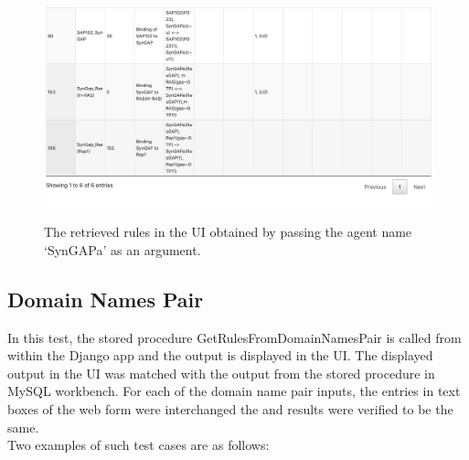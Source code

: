 \documentclass[msc,deptreport,ai]{infthesis}      %
\begin{document}
\begin{enumerate}
\begin{figure}[H]
		\includegraphics[width=\linewidth,height=6.5cm,keepaspectratio]{CorrectnessAgentName2.png}	
		\caption{The retrieved rules in the UI obtained by passing the agent name `SynGAPa' as an argument.}
		\label{fig:CorrectnessAgentName2}		
	\end{figure}	
\end{enumerate}


\subsection{Domain Names Pair}
In this test, the stored procedure GetRulesFromDomainNamesPair is called from within the Django app and the output is displayed in the UI. The displayed output in the UI was matched with the output from the stored procedure in MySQL workbench. For each of the domain name pair inputs, the entries in text boxes of the web form were interchanged the and results were verified to be the same.\\ Two examples of such test cases are as follows:
\end{document}

